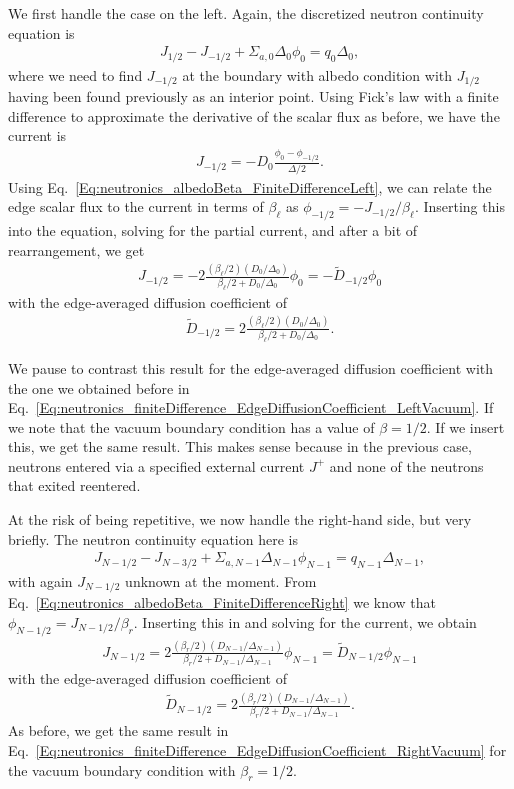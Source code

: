 We first handle the case on the left. Again, the discretized neutron continuity equation is
\begin{align}
  J_{1/2} - J_{-1/2} + \Sigma_{a,0} \Delta_0 \phi_0 = q_0 \Delta_0 ,
\end{align}
where we need to find $J_{-1/2}$ at the boundary with albedo condition with $J_{1/2}$ having been found previously as an interior point. Using Fick's law with a finite difference to approximate the derivative of the scalar flux as before, we have the current is
\begin{align}
  J_{-1/2} = -D_0 \frac{ \phi_0 - \phi_{-1/2} }{ \Delta / 2 } .
\end{align}
Using Eq.~\eqref{Eq:neutronics_albedoBeta_FiniteDifferenceLeft}, we can relate the edge scalar flux to the current in terms of $\beta_\ell$ as $\phi_{-1/2} = -J_{-1/2}/\beta_{\ell}$. Inserting this into the equation, solving for the partial current, and after a bit of rearrangement, we get
\begin{align}
  J_{-1/2} = -2 \frac{ ( \beta_\ell / 2 ) ( D_0 / \Delta_0 ) }{ \beta_\ell / 2 + D_0 / \Delta_0 } \phi_0 = - \widetilde{D}_{-1/2} \phi_0 
\end{align}
with the edge-averaged diffusion coefficient of
\begin{align}
  \widetilde{D}_{-1/2} = 2 \frac{ ( \beta_\ell / 2 ) ( D_0 / \Delta_0 ) }{ \beta_\ell / 2 + D_0 / \Delta_0 } .
\end{align}

We pause to contrast this result for the edge-averaged diffusion coefficient with the one we obtained before in Eq.~\eqref{Eq:neutronics_finiteDifference_EdgeDiffusionCoefficient_LeftVacuum}. If we note that the vacuum boundary condition has a value of $\beta = 1/2$. If we insert this, we get the same result. This makes sense because in the previous case, neutrons entered via a specified external current $J^+$ and none of the neutrons that exited reentered.

At the risk of being repetitive, we now handle the right-hand side, but very briefly. The neutron continuity equation here is
\begin{align}
  J_{N-1/2} - J_{N-3/2} + \Sigma_{a,N-1} \Delta_{N-1} \phi_{N-1} = q_{N-1} \Delta_{N-1} ,
\end{align}
with again $J_{N-1/2}$ unknown at the moment. From Eq.~\eqref{Eq:neutronics_albedoBeta_FiniteDifferenceRight} we know that $\phi_{N-1/2} = J_{N-1/2}/\beta_r$. Inserting this in and solving for the current, we obtain
\begin{align}
  J_{N-1/2} = 2 \frac{ ( \beta_r / 2 ) ( D_{N-1} / \Delta_{N-1} ) }{ \beta_r / 2 + D_{N-1} / \Delta_{N-1} } \phi_{N-1} =  \widetilde{D}_{N-1/2} \phi_{N-1}
\end{align}
with the edge-averaged diffusion coefficient of
\begin{align}
  \widetilde{D}_{N-1/2} = 2 \frac{ ( \beta_r / 2 ) ( D_{N-1} / \Delta_{N-1} ) }{ \beta_r / 2 + D_{N-1} / \Delta_{N-1} } .
\end{align}
As before, we get the same result in Eq.~\eqref{Eq:neutronics_finiteDifference_EdgeDiffusionCoefficient_RightVacuum} for the vacuum boundary condition with $\beta_r = 1/2$.

